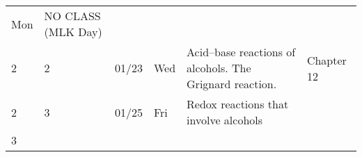\begin{longtable}[]{@{}llllll@{}}
\begin{minipage}[t]{0.04\columnwidth}
Mon\strut
\end{minipage} & \begin{minipage}[t]{0.49\columnwidth}\raggedright
NO CLASS (MLK Day)\strut
\end{minipage} & \begin{minipage}[t]{0.17\columnwidth}\raggedright
\strut
\end{minipage}\tabularnewline
\begin{minipage}[t]{0.03\columnwidth}\raggedright
2\strut
\end{minipage} & \begin{minipage}[t]{0.03\columnwidth}\raggedright
2\strut
\end{minipage} & \begin{minipage}[t]{0.06\columnwidth}\raggedright
01/23\strut
\end{minipage} & \begin{minipage}[t]{0.04\columnwidth}\raggedright
Wed\strut
\end{minipage} & \begin{minipage}[t]{0.49\columnwidth}\raggedright
Acid--base reactions of alcohols. The Grignard reaction.\strut
\end{minipage} & \begin{minipage}[t]{0.17\columnwidth}\raggedright
Chapter 12\strut
\end{minipage}\tabularnewline
\begin{minipage}[t]{0.03\columnwidth}\raggedright
2\strut
\end{minipage} & \begin{minipage}[t]{0.03\columnwidth}\raggedright
3\strut
\end{minipage} & \begin{minipage}[t]{0.06\columnwidth}\raggedright
01/25\strut
\end{minipage} & \begin{minipage}[t]{0.04\columnwidth}\raggedright
Fri\strut
\end{minipage} & \begin{minipage}[t]{0.49\columnwidth}\raggedright
Redox reactions that involve alcohols\strut
\end{minipage} & \begin{minipage}[t]{0.17\columnwidth}\raggedright
\strut
\end{minipage}\tabularnewline
\begin{minipage}[t]{0.03\columnwidth}\raggedright
3\strut
\end{minipage} & \begin{minipage}[t]{0.03\columnwidth}\raggedright

\end{minipage}
\end{longtable}
